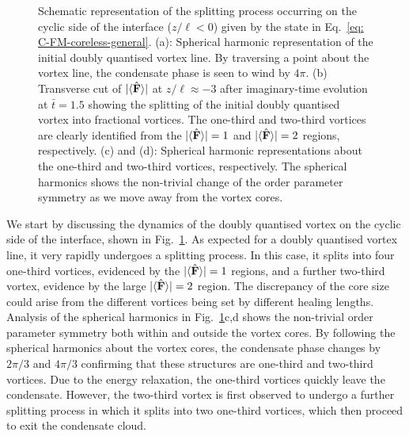 \begin{figure}
    \caption[Dynamics of the doubly quantised vortex connection in a cyclic to a
        ferromagnetic interface]
    {\label{fig: C-FM-coreless-cyclic}Schematic representation of the
        splitting process occurring on the cyclic side of the interface
        (\(z/\ell < 0\)) given by the state in
        Eq.~\eqref{eq: C-FM-coreless-general}.
        (a): Spherical harmonic representation of the initial doubly quantised
        vortex line. By traversing a point about the vortex line, the condensate
        phase is seen to wind by \(4\pi \).
        (b) Transverse cut of \(|\langle \hat{\vb{F}} \rangle | \) at \(z/\ell \approx -3\) after
        imaginary-time evolution at \(\bar{t} = 1.5\) showing the splitting of
        the initial doubly quantised vortex into fractional vortices.
        The one-third and two-third vortices are clearly identified from the
        \(|\langle \hat{\vb{F}} \rangle | = 1\) and \(|\langle \hat{\vb{F}} \rangle | = 2\) regions, respectively.
        (c) and (d): Spherical harmonic representations about the one-third and
        two-third vortices, respectively.
        The spherical harmonics shows the non-trivial change of the order
        parameter symmetry as we move away from the vortex cores.}
\end{figure}
We start by discussing the dynamics of the doubly quantised vortex on the cyclic
side of the interface, shown in Fig.~\ref{fig: C-FM-coreless-cyclic}.
As expected for a doubly quantised vortex line, it very rapidly undergoes a
splitting process.
In this case, it splits into four one-third vortices, evidenced by the
\(|\langle \hat{\vb{F}} \rangle | = 1\) regions, and a further two-third vortex, evidence by the large
\(|\langle \hat{\vb{F}} \rangle | = 2\) region.
The discrepancy of the core size could arise from the different vortices being
set by different healing lengths.
Analysis of the spherical harmonics in Fig.~\ref{fig: C-FM-coreless-cyclic}c,d
shows the non-trivial order parameter symmetry both within and outside the
vortex cores.
By following the spherical harmonics about the vortex cores, the condensate
phase changes by \(2\pi/3\) and \(4\pi/3\) confirming that these structures are
one-third and two-third vortices.
Due to the energy relaxation, the one-third vortices quickly leave the
condensate.
However, the two-third vortex is first observed to undergo a further splitting
process in which it splits into two one-third vortices, which then proceed to
exit the condensate cloud.

